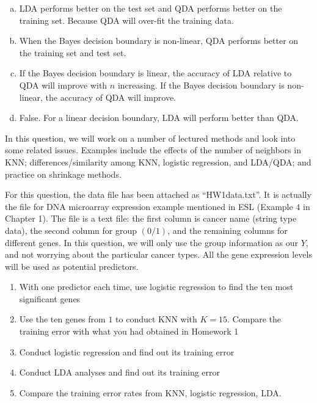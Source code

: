 \documentclass[14pt]{elegantbook}
\begin{document}
\begin{solution}
  \begin{enumerate}[(a)]
    \item LDA performs better on the test set and QDA performs better on the training set. Because QDA will over-fit the training data.
    \item When the Bayes decision boundary is non-linear, QDA performs better on the training set and test set.
    \item If the Bayes decision boundary is linear, the accuracy of LDA relative to QDA will improve with $n$ increasing. If the Bayes decision boundary is non-linear, the accuracy of QDA will improve. 
    \item False. For a linear decision boundary, LDA will perform better than QDA. 
  \end{enumerate}
\end{solution}

\begin{exercise*}
  In this question, we will work on a number of lectured methods and look into some related issues. Examples include the effects of the number of neighbors in KNN; differences/similarity among KNN, logistic regression, and LDA/QDA; and practice on shrinkage methods. 

  For this question, the data file has been attached as “HW1data.txt”. It is actually the file for DNA microarray expression example mentioned in ESL (Example 4 in Chapter 1). The file is a text file: the first column is cancer name (string type data), the second column for group $(0/1)$, and the remaining columns for different genes. In this question, we will only use the group information as our $Y$, and not worrying about the particular cancer types. All the gene expression levels will be used as potential predictors. 
  \begin{enumerate}
    \item With one predictor each time, use logistic regression to find the ten most significant genes
    \item Use the ten genes from $1$ to conduct KNN with $K=15$. Compare the training error with what you had obtained in Homework 1
    \item Conduct logistic regression and find out its training error
    \item Conduct LDA analyses and find out its training error
    \item Compare the training error rates from KNN, logistic regression, LDA. 
  \end{enumerate}
\end{exercise*}
\end{document}
